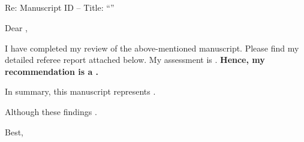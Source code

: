 



\begin{flushright}
\noindent \authorName \\ 
\schoolName \\
\address \\ 
\end{flushright}

\bigskip

\noindent \editorName \\ 
\journalName \\ 
\editorAddress

\bigskip
\begin{flushright}
\noindent \reviewDate %
\end{flushright}

\bigskip
\noindent Re: Manuscript ID \manuscriptID -- 
Title: ``\manuscriptTitle''

\bigskip

\noindent Dear \editorName,

\bigskip

\noindent I have completed my review of the above-mentioned manuscript. Please find my detailed referee report attached below. My assessment is \assessment. \textbf{Hence, my recommendation is a \recommendation.}

\bigskip

\noindent In summary, this manuscript represents \summaryPart.

\bigskip

\noindent Although these findings \limitations.

\bigskip

\noindent Best,\\[0.3cm]
\authorName %